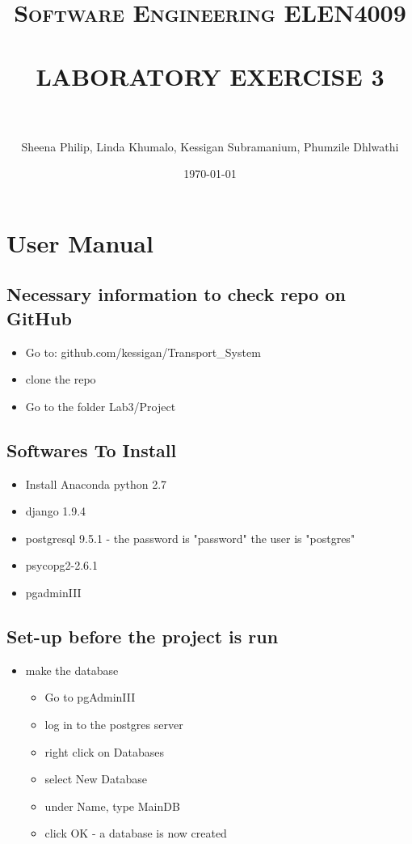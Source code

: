 \documentclass[paper=a4, fontsize=11pt]{scrartcl} %
\title{	
\normalfont \normalsize 
\textsc{Software Engineering ELEN4009} \\ [25pt] %
\horrule{0.5pt} \\[0.4cm] %
\huge LABORATORY EXERCISE 3 \\ %
\horrule{2pt} \\[0.5cm] %
}
\author{ Sheena Philip, Linda Khumalo, Kessigan Subramanium, Phumzile Dhlwathi} %
\date{\normalsize\today} %
\numberwithin{equation}{section} %
\numberwithin{figure}{section} %
\numberwithin{table}{section} %
\begin{document}
\maketitle %


\section{User Manual}

\subsection{Necessary information to check repo on GitHub}
\begin{itemize}
\item Go to: github.com/kessigan/Transport\_System
\item clone the repo
\item Go to the folder Lab3/Project
\end{itemize}

\subsection{Softwares To Install}
\begin{itemize}
\item  Install Anaconda python 2.7
\item django 1.9.4
\item postgresql 9.5.1 - the password is "password" the user is "postgres"
\item psycopg2-2.6.1
\item pgadminIII

\end{itemize}

\subsection{Set-up before the project is run}
\begin{itemize}
\item make the database
\begin{itemize}
\item Go to pgAdminIII
\item log in to the postgres server
\item right click on Databases
\item select New Database
\item under Name, type MainDB
\item click OK - a database is now created

\end{itemize}
\end{itemize}
\end{document}
